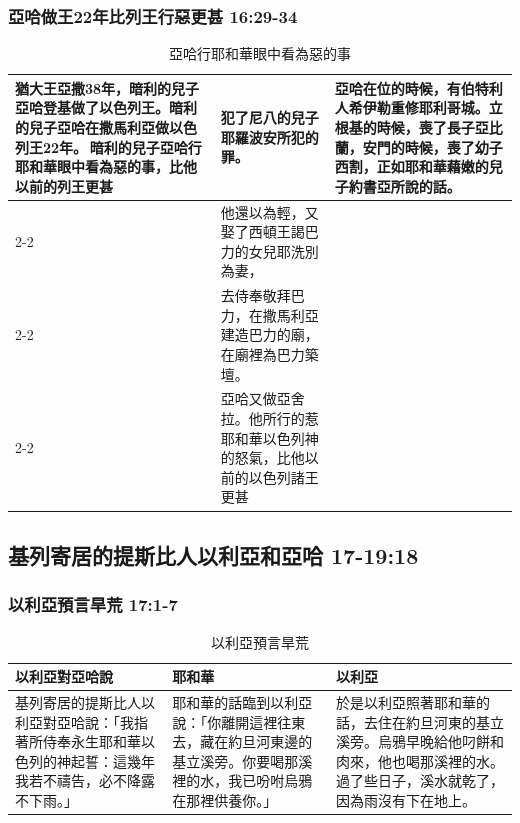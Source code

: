 \subsubsection{亞哈做王22年比列王行惡更甚 16:29-34} 
\begin{table}[H]
\centering 
\begin{tabular}{p{4.5cm}|p{8.3cm}|p{4cm}}\hline\hline
\multirow{4}{4.65cm}{猶大王亞撒38年，暗利的兒子亞哈登基做了以色列王。暗利的兒子亞哈在撒馬利亞做以色列王22年。 暗利的兒子亞哈行耶和華眼中看為惡的事，比他以前的列王更甚}
&犯了尼八的兒子耶羅波安所犯的罪。
&\multirow{3}{4.15cm}{亞哈在位的時候，有伯特利人希伊勒重修耶利哥城。立根基的時候，喪了長子亞比蘭，安門的時候，喪了幼子西割，正如耶和華藉嫩的兒子約書亞所說的話。}\\\cline{2-2}
&他還以為輕，又娶了西頓王謁巴力的女兒耶洗別為妻，&\\\cline{2-2}
&去侍奉敬拜巴力，在撒馬利亞建造巴力的廟，在廟裡為巴力築壇。&\\\cline{2-2}
&亞哈又做亞舍拉。他所行的惹耶和華以色列神的怒氣，比他以前的以色列諸王更甚&\\\hline
\end{tabular}
\caption{亞哈行耶和華眼中看為惡的事}
\end{table}


\subsection{基列寄居的提斯比人以利亞和亞哈 17-19:18 } 
\subsubsection{以利亞預言旱荒 17:1-7 } 
\begin{table}[H]
\centering 
\begin{tabular}{p{4.8cm}|p{5.5cm}|p{6cm}}\hline\hline
以利亞對亞哈說&耶和華&以利亞\\\hline
基列寄居的提斯比人以利亞對亞哈說：「我指著所侍奉永生耶和華以色列的神起誓：這幾年我若不禱告，必不降露不下雨。」 
&耶和華的話臨到以利亞說：「你離開這裡往東去，藏在約旦河東邊的基立溪旁。你要喝那溪裡的水，我已吩咐烏鴉在那裡供養你。」 
&於是以利亞照著耶和華的話，去住在約旦河東的基立溪旁。烏鴉早晚給他叼餅和肉來，他也喝那溪裡的水。過了些日子，溪水就乾了，因為雨沒有下在地上。\\\hline
\end{tabular}
\caption{以利亞預言旱荒}
\end{table}

